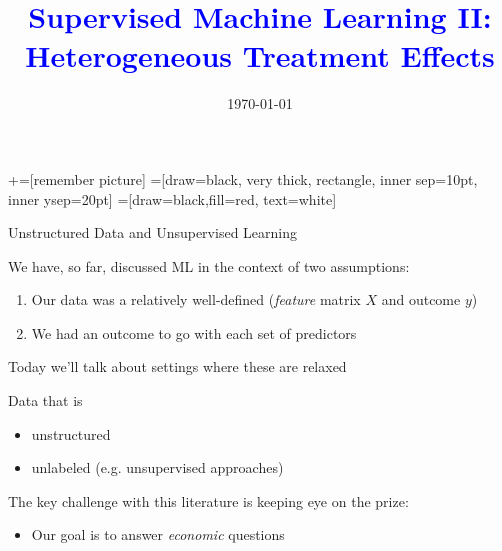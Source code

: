 \documentclass[notes,11pt, aspectratio=169]{beamer}
\title[]{\textcolor{blue}{Supervised Machine Learning II: \\ Heterogeneous Treatment Effects}} \author[PGP]{}
\institute[FRBNY]{\small{\begin{tabular}{c}
                           Paul Goldsmith-Pinkham  \\
\end{tabular}}}
\date{\today}
\newenvironment{wideitemize}{\itemize\addtolength{\itemsep}{10pt}}{\enditemize}
\begin{document}
\newcommand\marktopleft[1]{%
    \tikz[overlay,remember picture] 
        \node (marker-#1-a) at (-.3em,.3em) {};%
}
\newcommand\markbottomright[2]{%
    \tikz[overlay,remember picture] 
        \node (marker-#1-b) at (0em,0em) {};%
}
+=[remember picture] 
 =[draw=black, very thick, rectangle, inner sep=10pt, inner ysep=20pt]
 =[draw=black,fill=red, text=white]

\begin{frame}
\maketitle
\end{frame}

\begin{frame}{Unstructured Data and Unsupervised Learning}
  \begin{wideitemize}
  \item We have, so far, discussed ML in the context of two assumptions:
    \begin{enumerate}
    \item Our data was a relatively well-defined (\emph{feature} matrix $X$ and outcome $y$)
    \item We had an outcome to go with each set of predictors
    \end{enumerate}
  \item Today we'll talk about settings where these are relaxed
  \item Data that is 
    \begin{itemize}
    \item unstructured 
    \item unlabeled (e.g. unsupervised approaches)
    \end{itemize}
  \item The key challenge with this literature is keeping eye on the prize:
    \begin{itemize}
    \item Our goal is to answer \emph{economic} questions
    \end{itemize}
  \end{wideitemize}
\end{frame}
\end{document}
